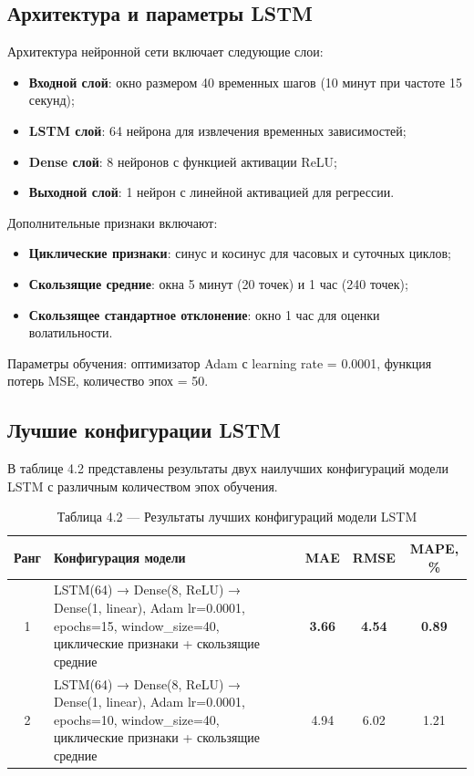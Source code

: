 \subsection{Архитектура и параметры LSTM}

\hspace*{1.25cm}Архитектура нейронной сети включает следующие слои:
\begin{itemize}
	\item \textbf{Входной слой}: окно размером 40 временных шагов (10 минут при частоте 15 секунд);
	\item \textbf{LSTM слой}: 64 нейрона для извлечения временных зависимостей;
	\item \textbf{Dense слой}: 8 нейронов с функцией активации ReLU;
	\item \textbf{Выходной слой}: 1 нейрон с линейной активацией для регрессии.
\end{itemize}

\hspace*{1.25cm}Дополнительные признаки включают:
\begin{itemize}
	\item \textbf{Циклические признаки}: синус и косинус для часовых и суточных циклов;
	\item \textbf{Скользящие средние}: окна 5 минут (20 точек) и 1 час (240 точек);
	\item \textbf{Скользящее стандартное отклонение}: окно 1 час для оценки волатильности.
\end{itemize}

\hspace*{1.25cm}Параметры обучения: оптимизатор Adam с learning rate = 0.0001, функция потерь MSE, количество эпох = 50.

\subsection{Лучшие конфигурации LSTM}

\hspace*{1.25cm}В таблице 4.2 представлены результаты двух наилучших конфигураций модели LSTM с различным количеством эпох обучения.

\begin{table}[H]
	\centering
	\caption*{Таблица 4.2 --- Результаты лучших конфигураций модели LSTM}
	\begin{tabular}{|c|p{8cm}|c|c|c|}
		\hline
		\textbf{Ранг} & \textbf{Конфигурация модели} & \textbf{MAE} & \textbf{RMSE} & \textbf{MAPE, \%} \\
		\hline
		1 & LSTM(64) → Dense(8, ReLU) → Dense(1, linear), Adam lr=0.0001, epochs=15, window\_size=40, циклические признаки + скользящие средние & \textbf{3.66} & \textbf{4.54} & \textbf{0.89} \\
		\hline
		2 & LSTM(64) → Dense(8, ReLU) → Dense(1, linear), Adam lr=0.0001, epochs=10, window\_size=40, циклические признаки + скользящие средние & 4.94 & 6.02 & 1.21 \\
		\hline
	\end{tabular}
	\label{tab:lstm_results}
\end{table}

